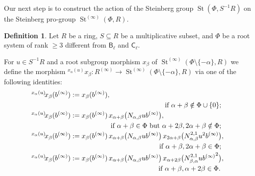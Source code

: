 \documentclass[oneside, 11pt]{amsart}
\numberwithin{equation}{section}
\theoremstyle{definition}
\newtheorem{df}[lemma]{Definition} \Crefname{df}{Definition}{Definitions}
\theoremstyle{remark}
\DeclareMathOperator\St{St}
\newcommand{\up}[2]{{^{#1}\!{#2}}}
\newcommand{\rB}{\mathsf{B}}
\newcommand{\rC}{\mathsf{C}}
\begin{document}
Our next step is to construct the action of the Steinberg group $\St(\Phi, S^{-1}R)$ on the Steinberg pro-group $\St^{(\infty)}(\Phi, R)$.
\begin{df}\label{root-action}
 Let \(R\) be a ring, \(S \subseteq R\) be a multiplicative subset, and \(\Phi\) be a root system of rank \(\geq 3\) different from \(\rB_\ell\) and \(\rC_\ell\).
 
 For $u \in S^{-1}R$ and a root subgroup morphism $x_\beta$ of $\St^{(\infty)}(\Phi\setminus\{-\alpha\}, R)$ we define the morphism 
 $\up{x_\alpha(u)}x_\beta \colon R^{(\infty)} \to \St^{(\infty)}(\Phi\setminus\{-\alpha\}, R)$
 via one of the following identities:
 \begin{align*}
 \up{x_\alpha(u)}{x_\beta(b^{(\infty)})}
 &:= x_\beta(b^{(\infty)}), \\
 \multispan2{\hfil if $\alpha + \beta \notin \Phi \cup \{0\}$;} \\
 \up{x_\alpha(u)}{x_\beta(b^{(\infty)})}
 &:= x_\beta(b^{(\infty)})\,
 x_{\alpha + \beta}\bigl(N_{\alpha, \beta} u b^{(\infty)}\bigr), \\
 \multispan2{\hfill if $\alpha + \beta \in \Phi$ but $\alpha + 2\beta, 2\alpha + \beta \notin \Phi$;} \\
 \up{x_\alpha(u)}{x_\beta(b^{(\infty)})}
 &:= x_\beta(b^{(\infty)})\,
  x_{\alpha + \beta}\bigl(N_{\alpha, \beta} u b^{(\infty)}\bigr)\,
  x_{2\alpha + \beta}\bigl(N^{2,1}_{\alpha, \beta} u^2 b^{(\infty)}\bigr), \\
 \multispan2{\hfill if $\alpha + \beta, 2\alpha + \beta \in \Phi$;} \\
 \up{x_\alpha(u)}{x_\beta(b^{(\infty)})}
 &:= x_\beta(b^{(\infty)})\,
  x_{\alpha + \beta}\bigl(N_{\alpha, \beta} u b^{(\infty)}\bigr)\,
  x_{\alpha + 2\beta}\bigl(N^{2,1}_{\beta, \alpha} u {b^{(\infty)}}^2\bigr), \\
 \multispan2{\hfill if $\alpha + \beta, \alpha + 2\beta \in \Phi$.}
 \end{align*} 
\end{df}
\end{document}

